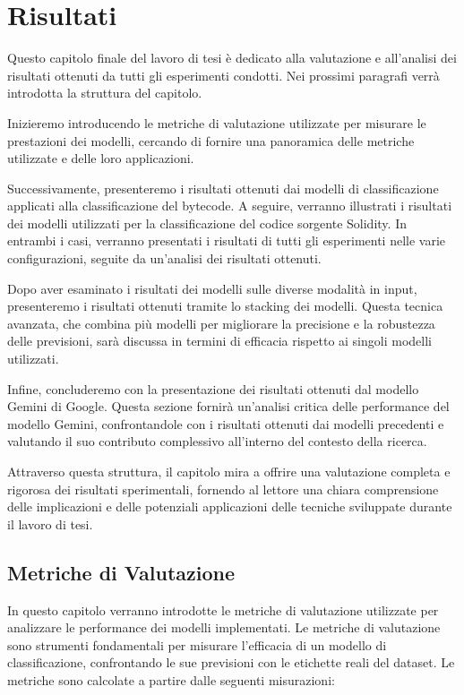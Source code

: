 \documentclass[../../Thesis.tex]{subfiles}
\begin{document}
\chapter{Risultati}
\label{chap:results}
Questo capitolo finale del lavoro di tesi è dedicato alla valutazione e all'analisi dei risultati ottenuti da tutti gli esperimenti condotti. Nei prossimi paragrafi verrà introdotta la struttura del capitolo. 

Inizieremo introducendo le metriche di valutazione utilizzate per misurare le prestazioni dei modelli, cercando di fornire una panoramica delle metriche utilizzate e delle loro applicazioni. 

Successivamente, presenteremo i risultati ottenuti dai modelli di classificazione applicati alla classificazione del bytecode. 
A seguire, verranno illustrati i risultati dei modelli utilizzati per la classificazione del codice sorgente Solidity. In entrambi i casi, verranno presentati i risultati di tutti gli esperimenti nelle varie configurazioni, seguite da un'analisi dei risultati ottenuti.

Dopo aver esaminato i risultati dei modelli sulle diverse modalità in input, presenteremo i risultati ottenuti tramite lo stacking dei modelli. Questa tecnica avanzata, che combina più modelli per migliorare la precisione e la robustezza delle previsioni, sarà discussa in termini di efficacia rispetto ai singoli modelli utilizzati.

Infine, concluderemo con la presentazione dei risultati ottenuti dal modello Gemini di Google. Questa sezione fornirà un'analisi critica delle performance del modello Gemini, confrontandole con i risultati ottenuti dai modelli precedenti e valutando il suo contributo complessivo all'interno del contesto della ricerca.

Attraverso questa struttura, il capitolo mira a offrire una valutazione completa e rigorosa dei risultati sperimentali, fornendo al lettore una chiara comprensione delle implicazioni e delle potenziali applicazioni delle tecniche sviluppate durante il lavoro di tesi.
\section{Metriche di Valutazione}

In questo capitolo verranno introdotte le metriche di valutazione utilizzate per analizzare le performance dei modelli implementati. Le metriche di valutazione sono strumenti fondamentali per misurare l'efficacia di un modello di classificazione, confrontando le sue previsioni con le etichette reali del dataset. Le metriche sono calcolate a partire dalle seguenti misurazioni:
\end{document}
